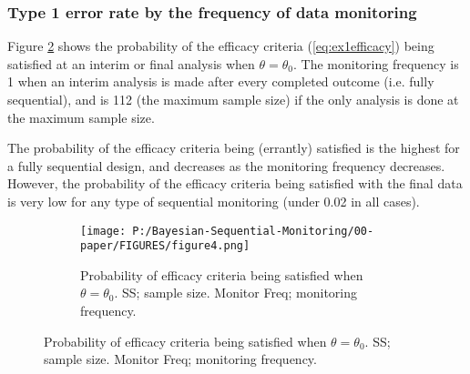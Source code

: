 \documentclass[12pt]{article}
\begin{document}

\subsubsection{Type 1 error rate by the frequency of data monitoring}
Figure \ref{fig:ex1t1e} shows the probability of the efficacy criteria (\ref{eq:ex1efficacy}) being satisfied at an interim or final analysis when $\theta=\theta_0$. The monitoring frequency is 1 when an interim analysis is made after every completed outcome (i.e. fully sequential), and is 112 (the maximum sample size) if the only analysis is done at the maximum sample size. 

The probability of the efficacy criteria being (errantly) satisfied is the highest for a fully sequential design, and decreases as the monitoring frequency decreases. However, the probability of the efficacy criteria being satisfied with the final data is very low for any type of sequential monitoring (under 0.02 in all cases).
\begin{figure}
  \begin{subfigure}{6in}
    \centering\texttt{[image: P:/Bayesian-Sequential-Monitoring/00-paper/FIGURES/figure4.png]}
    \caption{Probability of efficacy criteria being satisfied when $\theta=\theta_0$. SS; sample size. Monitor Freq; monitoring frequency.}
	\label{fig:ex1t1e}
  \end{subfigure}
 
\end{figure}
\end{document}
